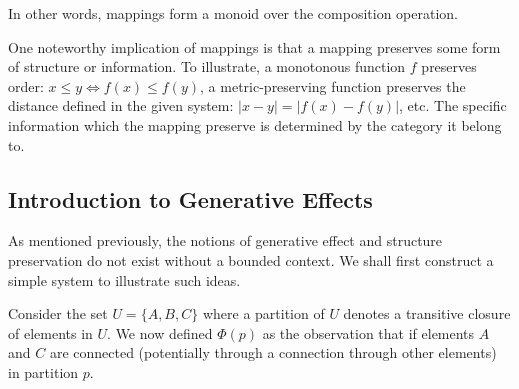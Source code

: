 \documentclass[12pt]{article}
\theoremstyle{definition}
\newcommand{\mo}[1]{\lvert #1 \rvert}
\begin{document}
	In other words, mappings form a monoid over the composition operation.
	
	One noteworthy implication of mappings is that a mapping preserves some form of structure or information. To illustrate, a monotonous function $f$ preserves order: $x \leq y \iff f(x) \leq f(y)$, a metric-preserving function preserves the distance defined in the given system: $\mo{x - y} = \mo{f(x) - f(y)}$, etc. The specific information which the mapping preserve is determined by the category it belong to.
	
	\subsection{Introduction to Generative Effects}
	
	As mentioned previously, the notions of generative effect and structure preservation do not exist without a bounded context. We shall first construct a simple system to illustrate such ideas.
	
	Consider the set $U = \{A, B, C\}$ where a partition of $U$ denotes a transitive closure of elements in $U$. We now defined $\Phi(p)$ as the observation that if elements $A$ and $C$ are connected (potentially through a connection through other elements) in partition $p$.
	
\end{document}
